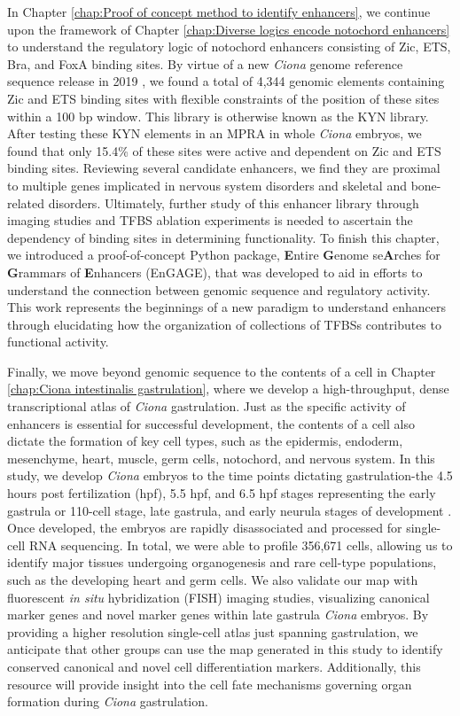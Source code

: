 \begin{dissertationepilogue}
    In Chapter \ref{chap:Proof of concept method to identify enhancers}, we continue upon the framework of Chapter \ref{chap:Diverse logics encode notochord enhancers} to understand the regulatory logic of notochord enhancers consisting of Zic, ETS, Bra, and FoxA binding sites. By virtue of a new \textit{Ciona} genome reference sequence release in 2019 \cite{satou2019}, we found a total of 4,344 genomic elements containing Zic and ETS binding sites with flexible constraints of the position of these sites within a 100 bp window. This library is otherwise known as the KYN library. After testing these KYN elements in an MPRA in whole \textit{Ciona} embryos, we found that only 15.4\% of these sites were active and dependent on Zic and ETS binding sites. Reviewing several candidate enhancers, we find they are proximal to multiple genes implicated in nervous system disorders and skeletal and bone-related disorders. Ultimately, further study of this enhancer library through imaging studies and TFBS ablation experiments is needed to ascertain the dependency of binding sites in determining functionality. To finish this chapter, we introduced a proof-of-concept Python package, \textbf{E}ntire \textbf{G}enome se\textbf{A}rches for \textbf{G}rammars of \textbf{E}nhancers (EnGAGE), that was developed to aid in efforts to understand the connection between genomic sequence and regulatory activity. This work represents the beginnings of a new paradigm to understand enhancers through elucidating how the organization of collections of TFBSs contributes to functional activity. 

    Finally, we move beyond genomic sequence to the contents of a cell in Chapter \ref{chap:Ciona intestinalis gastrulation}, where we develop a high-throughput, dense transcriptional atlas of \textit{Ciona} gastrulation. Just as the specific activity of enhancers is essential for successful development, the contents of a cell also dictate the formation of key cell types, such as the epidermis, endoderm, mesenchyme, heart, muscle, germ cells, notochord, and nervous system. In this study, we develop \textit{Ciona} embryos to the time points dictating gastrulation-the 4.5 hours post fertilization (hpf), 5.5 hpf, and 6.5 hpf stages representing the early gastrula or 110-cell stage, late gastrula, and early neurula stages of development \cite{satoh2014}. Once developed, the embryos are rapidly disassociated and processed for single-cell RNA sequencing. In total, we were able to profile 356,671 cells, allowing us to identify major tissues undergoing organogenesis and rare cell-type populations, such as the developing heart and germ cells. We also validate our map with fluorescent \textit{in situ} hybridization (FISH) imaging studies, visualizing canonical marker genes and novel marker genes within late gastrula \textit{Ciona} embryos. By providing a higher resolution single-cell atlas just spanning gastrulation, we anticipate that other groups can use the map generated in this study to identify conserved canonical and novel cell differentiation markers. Additionally, this resource will provide insight into the cell fate mechanisms governing organ formation during \textit{Ciona} gastrulation. 


\end{dissertationepilogue}
